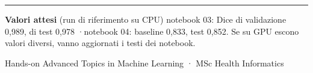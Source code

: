 \documentclass[10pt,a4paper]{article}
\begin{document}
\vfill
{\color{line}\rule{\linewidth}{0.6pt}}\par\vspace{5pt}
{\footnotesize\color{soft}\textbf{Valori attesi} (run di riferimento su CPU) \quad
notebook 03: Dice di validazione 0,989, di test 0,978 \quad·\quad notebook 04: baseline 0,833, test 0,852.
Se su GPU escono valori diversi, vanno aggiornati i testi dei notebook.\par
\vspace{3pt}Hands-on Advanced Topics in Machine Learning · MSc Health Informatics}
\end{document}
